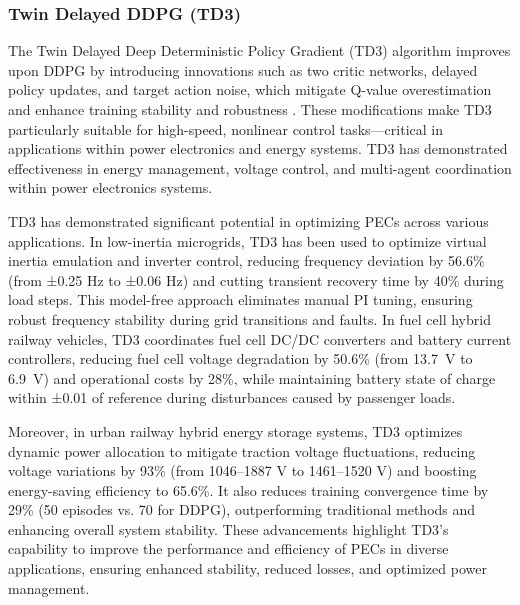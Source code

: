 \subsubsection{Twin Delayed DDPG (TD3)} 

The Twin Delayed Deep Deterministic Policy Gradient (TD3) algorithm improves upon DDPG by introducing innovations such as two critic networks, delayed policy updates, and target action noise, which mitigate Q-value overestimation and enhance training stability and robustness \cite{fujimoto2018addressing}. These modifications make TD3 particularly suitable for high-speed, nonlinear control tasks—critical in applications within power electronics and energy systems. TD3 has demonstrated effectiveness in energy management, voltage control, and multi-agent coordination within power electronics systems.

TD3 has demonstrated significant potential in optimizing PECs across various applications. In low-inertia microgrids, TD3 has been used to optimize virtual inertia emulation and inverter control, reducing frequency deviation by 56.6\% (from ±0.25 Hz to ±0.06 Hz) and cutting transient recovery time by 40\% during load steps. This model-free approach eliminates manual PI tuning, ensuring robust frequency stability during grid transitions and faults. In fuel cell hybrid railway vehicles, TD3 coordinates fuel cell DC/DC converters and battery current controllers, reducing fuel cell voltage degradation by 50.6\% (from 13.7~\micro V to 6.9~\micro V) and operational costs by 28\%, while maintaining battery state of charge within ±0.01 of reference during disturbances caused by passenger loads.

Moreover, in urban railway hybrid energy storage systems, TD3 optimizes dynamic power allocation to mitigate traction voltage fluctuations, reducing voltage variations by 93\% (from 1046–1887 V to 1461–1520 V) and boosting energy-saving efficiency to 65.6\%. It also reduces training convergence time by 29\% (50 episodes vs. 70 for DDPG), outperforming traditional methods and enhancing overall system stability. These advancements highlight TD3's capability to improve the performance and efficiency of PECs in diverse applications, ensuring enhanced stability, reduced losses, and optimized power management.


